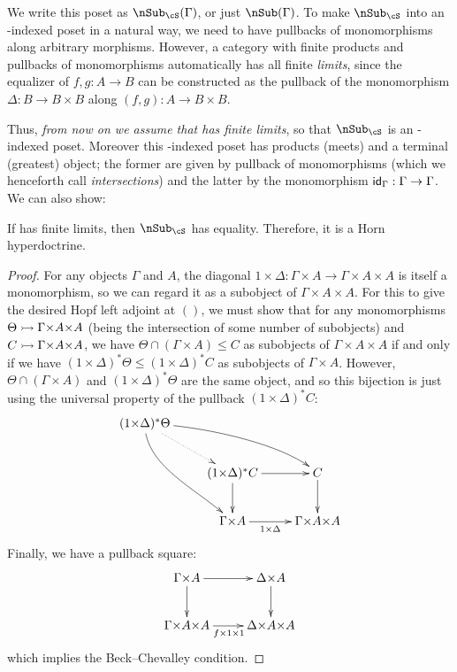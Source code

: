 We write this poset as $\sub_\cS(\Gamma)$, or just $\sub(\Gamma)$.
To make $\sub_\cS$ into an \cS-indexed poset in a natural way, we need \cS to have pullbacks of monomorphisms along arbitrary morphisms.
However, a category with finite products and pullbacks of monomorphisms automatically has all finite \emph{limits}, since the equalizer of $f,g:A\to B$ can be constructed as the pullback of the monomorphism $\Delta:B\to B\times B$ along $(f,g):A\to B\times B$.

Thus, \emph{from now on we assume that \cS has finite limits}, so that $\sub_\cS$ is an \cS-indexed poset.
Moreover this \cS-indexed poset has products (meets) and a terminal (greatest) object; the former are given by pullback of monomorphisms (which we henceforth call \emph{intersections}) and the latter by the monomorphism $\mathsf{id}_\Gamma : \Gamma \to \Gamma$.
We can also show:

\begin{thm}\label{thm:horn-subobjects}
  If \cS has finite limits, then $\sub_\cS$ has equality.
  Therefore, it is a Horn hyperdoctrine.
\end{thm}
\begin{proof}
  For any objects $\Gamma$ and $A$, the diagonal $1\times \Delta : \Gamma\times A \to \Gamma\times A\times A$ is itself a monomorphism, so we can regard it as a subobject of $\Gamma\times A\times A$.
  For this to give the desired Hopf left adjoint at $()$, we must show that for any monomorphisms $\Theta \mono \Gamma\times A\times A$ (being the intersection of some number of subobjects) and $C \mono \Gamma\times A\times A$, we have $\Theta \cap (\Gamma\times A) \le C$ as subobjects of $\Gamma\times A\times A$ if and only if we have $(1\times \Delta)^* \Theta \le (1\times \Delta)^* C$ as subobjects of $\Gamma\times A$.
  However, $\Theta \cap (\Gamma\times A)$ and $(1\times \Delta)^* \Theta$ are the same object, and so this bijection is just using the universal property of the pullback $(1\times \Delta)^* C$:
  \[ \xymatrix{ (1\times \Delta)^* \Theta \ar@(r,ul)[drr] \ar@(d,ul)[ddr] \ar@{.>}[dr] \\
    & (1\times \Delta)^* C \ar[d] \ar[r] & C \ar[d]\\
    & \Gamma\times A \ar[r]_-{1\times\Delta} & \Gamma\times A\times A } \]
  Finally, we have a pullback square:
  \[ \xymatrix{ \Gamma\times A \ar[r] \ar[d] & \Delta\times A \ar[d] \\
    \Gamma\times A\times A \ar[r]_{f\times 1\times 1} & \Delta\times A\times A } \]
  which implies the Beck--Chevalley condition.
\end{proof}


